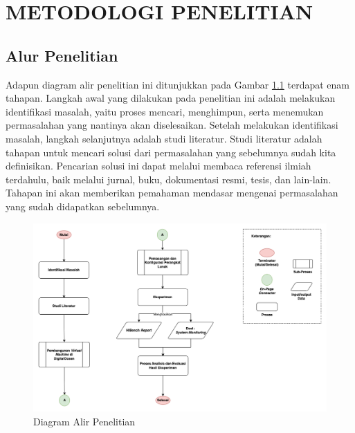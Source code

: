 \chapter{METODOLOGI PENELITIAN}
%


\section{Alur Penelitian}
Adapun diagram alir penelitian ini ditunjukkan pada Gambar \ref{fig:diagram alir} terdapat enam tahapan. Langkah awal yang dilakukan pada penelitian ini adalah melakukan identifikasi masalah, yaitu proses mencari, menghimpun, serta menemukan permasalahan yang nantinya akan diselesaikan. Setelah melakukan identifikasi masalah, langkah selanjutnya adalah studi literatur. Studi literatur adalah tahapan untuk mencari solusi dari permasalahan yang sebelumnya sudah kita definisikan. Pencarian solusi ini dapat melalui membaca referensi ilmiah terdahulu, baik melalui jurnal, buku, dokumentasi resmi, tesis, dan lain-lain. Tahapan ini akan memberikan pemahaman mendasar mengenai permasalahan yang sudah didapatkan sebelumnya. 
        
\begin{figure}[h!]
    \centering
    \includegraphics[width=1\textwidth]{figures/ch03/Diagram Tugas Akhir.png}
    \caption{Diagram Alir Penelitian}
    \label{fig:diagram alir}
\end{figure}

